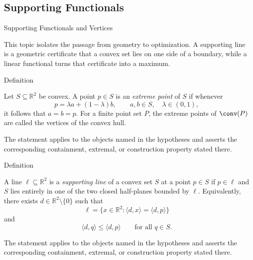 \subsection*{Supporting Functionals}

\begin{topicbox}{Supporting Functionals and Vertices}
\begin{exposition}
This topic isolates the passage from geometry to optimization. A supporting
line is a geometric certificate that a convex set lies on one side of a
boundary, while a linear functional turns that certificate into a maximum.
\end{exposition}

\begin{definitionbox}{Definition}
\begin{definition}
\label{def:computational-geometry-extreme-point}
Let \(S\subseteq\mathbb{R}^2\) be convex. A point \(p\in S\) is an
\emph{extreme point} of \(S\) if whenever
\[
  p=\lambda a+(1-\lambda)b,
  \qquad
  a,b\in S,\quad \lambda\in(0,1),
\]
it follows that \(a=b=p\). For a finite point set \(P\), the extreme points of
\(\conv(P)\) are called the vertices of the convex hull.
\end{definition}
\end{definitionbox}

\begin{remark*}
The statement applies to the objects named in the hypotheses and asserts the
corresponding containment, extremal, or construction property stated there.
\end{remark*}

\NoLocalDependencies

\begin{definitionbox}{Definition}
\begin{definition}
\label{def:computational-geometry-supporting-line}
A line \(\ell\subseteq\mathbb{R}^2\) is a \emph{supporting line} of a convex set
\(S\) at a point \(p\in S\) if \(p\in\ell\) and \(S\) lies entirely in one of the
two closed half-planes bounded by \(\ell\). Equivalently, there exists
\(d\in\mathbb{R}^2\setminus\{0\}\) such that
\[
  \ell=\{x\in\mathbb{R}^2:\langle d,x\rangle=\langle d,p\rangle\}
\]
and
\[
  \langle d,q\rangle\le \langle d,p\rangle
  \qquad
  \text{for all } q\in S.
\]
\end{definition}
\end{definitionbox}

\begin{remark*}
The statement applies to the objects named in the hypotheses and asserts the
corresponding containment, extremal, or construction property stated there.
\end{remark*}


\end{topicbox}
